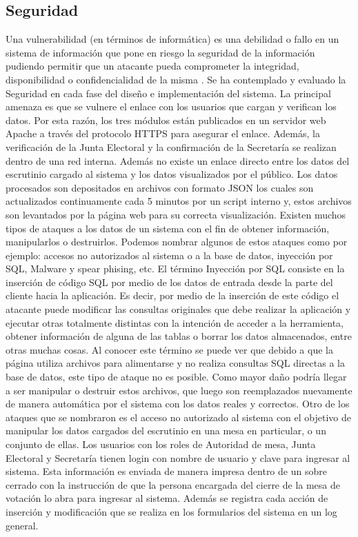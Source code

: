 \subsection{Seguridad}
Una vulnerabilidad (en términos de informática) es una debilidad o fallo en un sistema de información que pone en riesgo la seguridad de la información pudiendo permitir que un atacante pueda comprometer la integridad, disponibilidad o confidencialidad de la misma \cite{definicionVulnerabilidad}.
Se ha contemplado y evaluado la Seguridad en cada fase  del diseño e implementación del sistema.  La principal amenaza es que se vulnere el enlace con los usuarios que cargan y verifican los datos.  Por esta razón, los tres módulos están publicados en un servidor web Apache a través del protocolo HTTPS para asegurar el enlace. Además, la verificación de la Junta Electoral y la confirmación de la Secretaría se realizan dentro de una red interna. \newline
Además no existe un enlace directo entre los datos del escrutinio cargado al sistema y los datos visualizados por el público. Los datos procesados son depositados en archivos con formato JSON los cuales son actualizados continuamente cada 5 minutos por un script interno y, estos archivos son levantados por la página web para su correcta visualización. Existen muchos tipos de ataques a los datos de un sistema con el fin de obtener información, manipularlos o destruirlos. Podemos nombrar algunos de estos ataques como por ejemplo: accesos no autorizados al sistema o a la base de datos, inyección por SQL, Malware y spear phising, etc. El término Inyección por SQL consiste en la inserción de código SQL por medio de los datos de entrada desde la parte del cliente hacia la aplicación. Es decir, por medio de la inserción de este código el atacante puede modificar las consultas originales que debe realizar la aplicación y ejecutar otras totalmente distintas con la intención de acceder a la herramienta, obtener información de alguna de las tablas o borrar los datos almacenados, entre otras muchas cosas. Al conocer este término se puede ver que debido a que la página utiliza archivos para alimentarse y no realiza consultas SQL directas a la base de datos, este tipo de ataque no es posible. Como mayor daño podría llegar a ser manipular o destruir estos archivos, que luego son reemplazados nuevamente de manera automática por el sistema con los datos reales y correctos. \newline
Otro de los ataques que se nombraron es el acceso no autorizado al sistema con el objetivo de manipular los datos cargados del escrutinio en una mesa en particular, o un conjunto de ellas. Los usuarios con los roles de Autoridad de mesa, Junta Electoral y Secretaría tienen login con nombre de usuario y clave para ingresar al sistema. Esta información es enviada de manera impresa dentro de un sobre cerrado con la instrucción de que la persona encargada del cierre de la mesa de votación lo abra para ingresar al sistema. Además se registra cada acción de inserción y modificación que se realiza en los formularios del sistema en un log general. \newline


